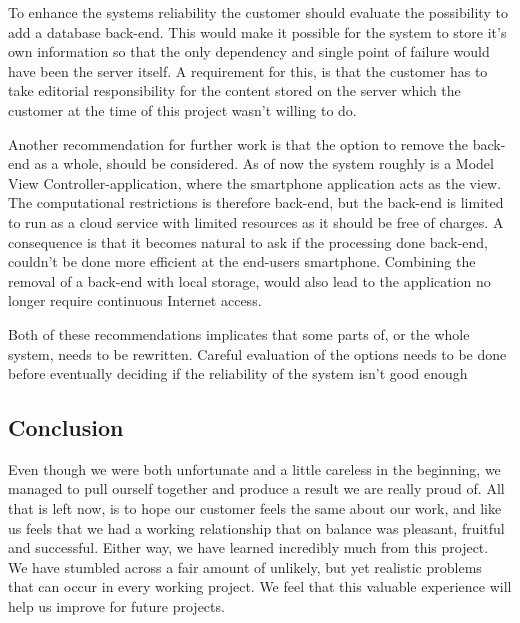 To enhance the systems reliability the customer should evaluate the possibility to add a database back-end. This would make it possible for the system to store it's own information so that the only dependency and single point of failure would have been the server itself. A requirement for this, is that the customer has to take editorial responsibility for the content stored on the server which the customer at the time of this project wasn't willing to do.

Another recommendation for further work is that the option to remove the back-end as a whole, should be considered. As of now the system roughly is a Model View Controller-application, where the smartphone application acts as the view. The computational restrictions is therefore back-end, but the back-end is limited to run as a cloud service with limited resources as it should be free of charges. A consequence is that it becomes natural to ask if the processing done back-end, couldn't be done more efficient at the end-users smartphone. Combining the removal of a back-end with local storage, would also lead to the application no longer require continuous Internet access.

Both of these recommendations implicates that some parts of, or the whole system, needs to be rewritten. Careful evaluation of the options needs to be done before eventually deciding if the reliability of the system isn't good enough

\subsection{Conclusion}

Even though we were both unfortunate and a little careless in the beginning, we managed to pull ourself together and produce a result we are really proud of. All that is left now, is to hope our customer feels the same about our work, and like us feels that we had a working relationship that on balance was pleasant, fruitful and successful. Either way, we have learned incredibly much from this project. We have stumbled across a fair amount of unlikely, but yet realistic problems that can occur in every working project. We feel that this valuable experience will help us improve for future projects.
